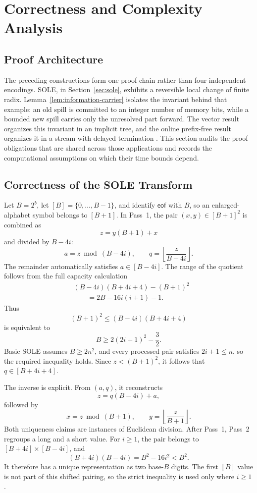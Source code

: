 \section{Correctness and Complexity Analysis}
\label{sec:correctness-analysis}

\subsection{Proof Architecture}

The preceding constructions form one proof chain rather than four independent
encodings.  SOLE, in Section~\ref{sec:sole}, exhibits a reversible local change
of finite radix.  Lemma~\ref{lem:information-carrier} isolates the invariant
behind that example: an old spill is committed to an integer number of memory
bits, while a bounded new spill carries only the unresolved part forward.  The
vector result organizes this invariant in an implicit tree, and the online
prefix-free result organizes it in a stream with delayed termination
\cite{dodis2010changing}.  This section audits the proof obligations that are
shared across those applications and records the computational assumptions on
which their time bounds depend.

\subsection{Correctness of the SOLE Transform}

Let \(B=2^b\), let \([B]=\{0,\ldots,B-1\}\), and identify
\(\mathsf{eof}\) with \(B\), so an enlarged-alphabet symbol belongs to
\([B+1]\).  In Pass~1, the pair \((x,y)\in[B+1]^2\) is combined as
\[
    z=y(B+1)+x
\]
and divided by \(B-4i\):
\[
    a=z\bmod(B-4i),
    \qquad
    q=\left\lfloor\frac{z}{B-4i}\right\rfloor.
\]
The remainder automatically satisfies \(a\in[B-4i]\).  The range of the
quotient follows from the full capacity calculation
\[
\begin{aligned}
 &(B-4i)(B+4i+4)-(B+1)^2\\
 &\qquad=2B-16i(i+1)-1.
\end{aligned}
\]
Thus
\[
    (B+1)^2\leq(B-4i)(B+4i+4)
\]
is equivalent to
\[
    B\geq 2(2i+1)^2-\frac{3}{2}.
\]
Basic SOLE assumes \(B\geq2n^2\), and every processed pair satisfies
\(2i+1\leq n\), so the required inequality holds.  Since
\(z<(B+1)^2\), it follows that \(q\in[B+4i+4]\).

The inverse is explicit.  From \((a,q)\), it reconstructs
\[
    z=q(B-4i)+a,
\]
followed by
\[
    x=z\bmod(B+1),
    \qquad
    y=\left\lfloor\frac{z}{B+1}\right\rfloor.
\]
Both uniqueness claims are instances of Euclidean division.  After Pass~1,
Pass~2 regroups a long and a short value.  For \(i\geq1\), the pair belongs to
\([B+4i]\times[B-4i]\), and
\[
    (B+4i)(B-4i)=B^2-16i^2<B^2.
\]
It therefore has a unique representation as two base-\(B\) digits.  The first
\([B]\) value is not part of this shifted pairing, so the strict inequality is
used only where \(i\geq1\).

